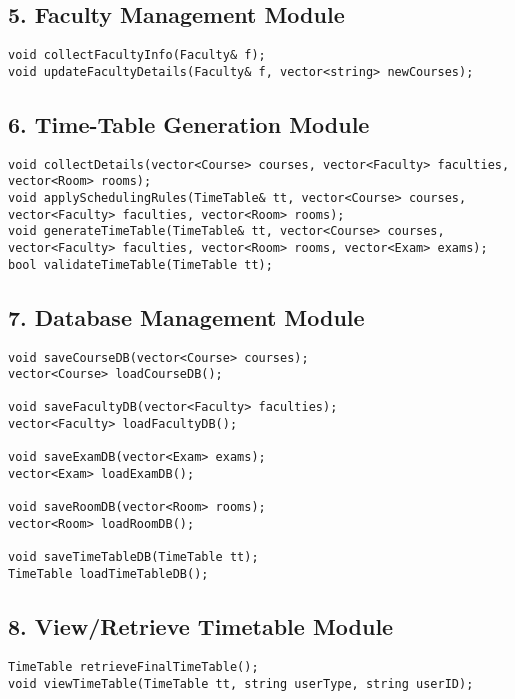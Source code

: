 \documentclass[12pt]{article}
\begin{document}
\subsection*{5. Faculty Management Module}
\begin{lstlisting}[style=cppstyle]
void collectFacultyInfo(Faculty& f);
void updateFacultyDetails(Faculty& f, vector<string> newCourses);
\end{lstlisting}

\subsection*{6. Time-Table Generation Module}
\begin{lstlisting}[style=cppstyle]
void collectDetails(vector<Course> courses, vector<Faculty> faculties, vector<Room> rooms);
void applySchedulingRules(TimeTable& tt, vector<Course> courses, vector<Faculty> faculties, vector<Room> rooms);
void generateTimeTable(TimeTable& tt, vector<Course> courses, vector<Faculty> faculties, vector<Room> rooms, vector<Exam> exams);
bool validateTimeTable(TimeTable tt);
\end{lstlisting}

\subsection*{7. Database Management Module}
\begin{lstlisting}[style=cppstyle]
void saveCourseDB(vector<Course> courses);
vector<Course> loadCourseDB();

void saveFacultyDB(vector<Faculty> faculties);
vector<Faculty> loadFacultyDB();

void saveExamDB(vector<Exam> exams);
vector<Exam> loadExamDB();

void saveRoomDB(vector<Room> rooms);
vector<Room> loadRoomDB();

void saveTimeTableDB(TimeTable tt);
TimeTable loadTimeTableDB();
\end{lstlisting}

\subsection*{8. View/Retrieve Timetable Module}
\begin{lstlisting}[style=cppstyle]
TimeTable retrieveFinalTimeTable();
void viewTimeTable(TimeTable tt, string userType, string userID);
\end{lstlisting}
\end{document}
